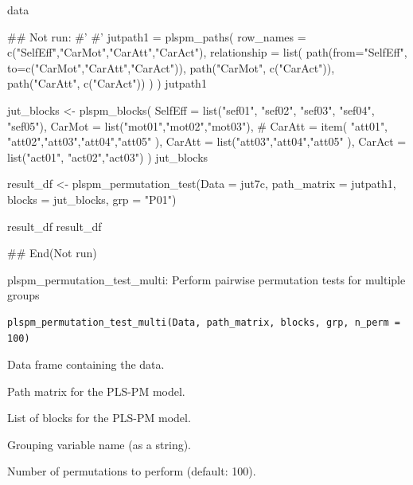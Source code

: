 \documentclass[a4paper]{book}
\begin{document}
%
\begin{Value}
data
\end{Value}
%
\begin{Examples}
\begin{ExampleCode}
## Not run: 
#'
#'
jutpath1 = plspm_paths(
  row_names = c("SelfEff","CarMot","CarAtt","CarAct"),
  relationship = list(
    path(from="SelfEff", to=c("CarMot","CarAtt","CarAct")),
    path("CarMot", c("CarAct")),
    path("CarAtt", c("CarAct"))
  )  )
jutpath1


jut_blocks <- plspm_blocks(
  SelfEff = list("sef01", "sef02", "sef03", "sef04", "sef05"),
  CarMot = list("mot01","mot02","mot03"),
  #   CarAtt = item( "att01", "att02","att03","att04","att05" ),
  CarAtt = list("att03","att04","att05" ),
  CarAct = list("act01", "act02","act03")
)
jut_blocks


result_df <- plspm_permutation_test(Data = jut7c, path_matrix = jutpath1, blocks = jut_blocks, grp = "P01")


result_df
result_df %



## End(Not run)

\end{ExampleCode}
\end{Examples}
%
\begin{Description}
plspm\_permutation\_test\_multi: Perform pairwise permutation tests for multiple groups
\end{Description}
%
\begin{Usage}
\begin{verbatim}
plspm_permutation_test_multi(Data, path_matrix, blocks, grp, n_perm = 100)
\end{verbatim}
\end{Usage}
%
\begin{Arguments}
\begin{ldescription}
\item[\code{Data}] Data frame containing the data.

\item[\code{path\_matrix}] Path matrix for the PLS-PM model.

\item[\code{blocks}] List of blocks for the PLS-PM model.

\item[\code{grp}] Grouping variable name (as a string).

\item[\code{n\_perm}] Number of permutations to perform (default: 100).
\end{ldescription}
\end{Arguments}
\end{document}

